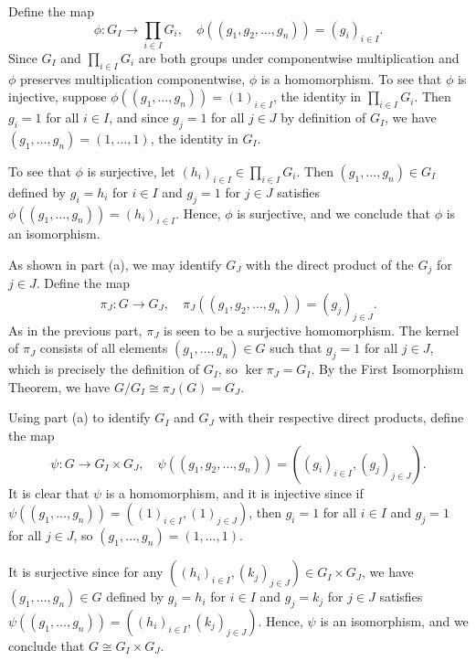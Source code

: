 \begin{solenum}
    \item Define the map
    \[
        \phi : G_I \to \prod_{i \in I} G_i, \quad \phi((g_1, g_2, \ldots, g_n)) = (g_i)_{i \in I}.
    \]
    Since $G_I$ and $\prod_{i \in I} G_i$ are both groups under componentwise multiplication and $\phi$ preserves multiplication componentwise, $\phi$ is a homomorphism.
    To see that $\phi$ is injective, suppose $\phi((g_1, \ldots, g_n)) = (1)_{i \in I}$, the identity in $\prod_{i \in I} G_i$.
    Then $g_i = 1$ for all $i \in I$, and since $g_j = 1$ for all $j \in J$ by definition of $G_I$, we have $(g_1, \ldots, g_n) = (1, \ldots, 1)$, the identity in $G_I$.

    To see that $\phi$ is surjective, let $(h_i)_{i \in I} \in \prod_{i \in I} G_i$.
    Then $(g_1, \ldots, g_n) \in G_I$ defined by $g_i = h_i$ for $i \in I$ and $g_j = 1$ for $j \in J$ satisfies $\phi((g_1, \ldots, g_n)) = (h_i)_{i \in I}$.
    Hence, $\phi$ is surjective, and we conclude that $\phi$ is an isomorphism.
    \item As shown in part (a), we may identify $G_J$ with the direct product of the $G_j$ for $j \in J$.
    Define the map
    \[
        \pi_J : G \to G_J, \quad \pi_J((g_1, g_2, \ldots, g_n)) = (g_j)_{j \in J}.
    \]
    As in the previous part, $\pi_J$ is seen to be a surjective homomorphism.
    The kernel of $\pi_J$ consists of all elements $(g_1, \ldots, g_n) \in G$ such that $g_j = 1$ for all $j \in J$, which is precisely the definition of $G_I$, so $\ker \pi_J = G_I$.
    By the First Isomorphism Theorem, we have $G/G_I \cong \pi_J(G) = G_J$.
    \item Using part (a) to identify $G_I$ and $G_J$ with their respective direct products, define the map
    \[
        \psi : G \to G_I \times G_J, \quad \psi((g_1, g_2, \ldots, g_n)) = ((g_i)_{i \in I}, (g_j)_{j \in J}).
    \]
    It is clear that $\psi$ is a homomorphism, and it is injective since if $\psi((g_1, \ldots, g_n)) = ((1)_{i \in I}, (1)_{j \in J})$, then $g_i = 1$ for all $i \in I$ and $g_j = 1$ for all $j \in J$, so $(g_1, \ldots, g_n) = (1, \ldots, 1)$.

    It is surjective since for any $((h_i)_{i \in I}, (k_j)_{j \in J}) \in G_I \times G_J$, we have $(g_1, \ldots, g_n) \in G$ defined by $g_i = h_i$ for $i \in I$ and $g_j = k_j$ for $j \in J$ satisfies $\psi((g_1, \ldots, g_n)) = ((h_i)_{i \in I}, (k_j)_{j \in J})$.
    Hence, $\psi$ is an isomorphism, and we conclude that $G \cong G_I \times G_J$.
\end{solenum}

